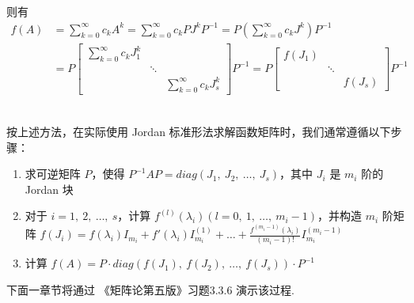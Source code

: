             则有 
            \begin{align*}
                f(A) &= \sum_{k=0}^{\infty}c_kA^k = \sum_{k=0}^{\infty}c_kPJ^kP^{-1} = P(\sum_{k=0}^{\infty}c_kJ^k)P^{-1} \\ &= P\begin{bmatrix}
                    \sum_{k=0}^{\infty}c_kJ_1^k & & \\ & \ddots & \\ & & \sum_{k=0}^{\infty}c_kJ_s^k
                \end{bmatrix}P^{-1} = P \begin{bmatrix}
                    f(J_1) & & \\ & \ddots & \\ & & f(J_s)
                \end{bmatrix} P^{-1}
            \end{align*}
            \\
            \par 按上述方法，在实际使用 Jordan 标准形法求解函数矩阵时，我们通常遵循以下步骤：
            \begin{enumerate}
                \item 求可逆矩阵 $P$，使得 $P^{-1}AP = diag(J_1, \ J_2, \ \dots, \ J_s)$，其中 $J_i$ 是 $m_i$ 阶的 Jordan 块 
                \item 对于 $i = 1, \ 2, \ \dots, \ s$，计算 $f^{(l)}(\lambda_i)(l = 0, \ 1, \ \dots, \ m_i - 1)$，并构造 $m_i$ 阶矩阵 $f(J_i) = f(\lambda_i)I_{m_i} + f'(\lambda_i)I_{m_i}^{(1)} + \dots + \frac{f^{(m_i-1)}(\lambda_i)}{(m_i - 1)!}I_{m_i}^{(m_i-1)}$
                \item 计算 $f(A) = P \cdot diag(f(J_1), \ f(J_2), \ \dots, \ f(J_s)) \cdot P^{-1}$
            \end{enumerate}
            \par 下面一章节将通过 《矩阵论第五版》习题3.3.6 演示该过程.

